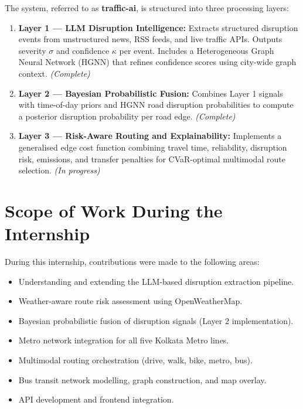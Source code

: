 \documentclass[12pt, a4paper]{report}
\begin{document}
The system, referred to as \textbf{traffic-ai}, is structured into three processing layers:

\begin{enumerate}
    \item \textbf{Layer 1 — LLM Disruption Intelligence:} Extracts structured disruption events from unstructured news, RSS feeds, and live traffic APIs. Outputs severity $\sigma$ and confidence $\kappa$ per event. Includes a Heterogeneous Graph Neural Network (HGNN) that refines confidence scores using city-wide graph context. \textit{(Complete)}
    \item \textbf{Layer 2 — Bayesian Probabilistic Fusion:} Combines Layer 1 signals with time-of-day priors and HGNN road disruption probabilities to compute a posterior disruption probability per road edge. \textit{(Complete)}
    \item \textbf{Layer 3 — Risk-Aware Routing and Explainability:} Implements a generalised edge cost function combining travel time, reliability, disruption risk, emissions, and transfer penalties for CVaR-optimal multimodal route selection. \textit{(In progress)}
\end{enumerate}

\section{Scope of Work During the Internship}

During this internship, contributions were made to the following areas:

\begin{itemize}
    \item Understanding and extending the LLM-based disruption extraction pipeline.
    \item Weather-aware route risk assessment using OpenWeatherMap.
    \item Bayesian probabilistic fusion of disruption signals (Layer 2 implementation).
    \item Metro network integration for all five Kolkata Metro lines.
    \item Multimodal routing orchestration (drive, walk, bike, metro, bus).
    \item Bus transit network modelling, graph construction, and map overlay.
    \item API development and frontend integration.
\end{itemize}

\clearpage
\end{document}
